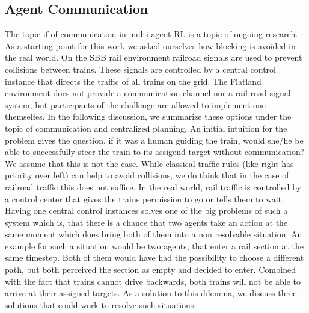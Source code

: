 \subsection*{Agent Communication}\label{agent_communication}
The topic if of communication in multi agent RL is a topic of ongoing research. As a starting point for this work we asked ourselves how blocking is avoided in the real world. On the SBB rail environment railroad signals are used to prevent collisions between trains. These signals are controlled by a central control instance that directs the traffic of all trains on the grid.
The Flatland environment does not provide a communication channel nor a rail road signal system, but participants of the challenge are allowed to implement one themselfes. In the following discussion, we summarize these options under the topic of communication and centralized planning. An initial intuition for the problem gives the question, if it was a human guiding the train, would she/he be able to successfully steer the train to its assigend target without communication?
We assume that this is not the case. While classical traffic rules (like right has priority over left) can help to avoid collisions, we do think that in the case of railroad traffic this does not suffice. In the real world, rail traffic is controlled by a control center that gives the trains permission to go or tells them to wait. Having one central control instances solves one of the big problems of such a system which is, that there is a chance that two agents take an action at the same moment which does bring both of them into a non resolvable situation. An example for such a situation would be two agents, that enter a rail section at the same timestep. Both of them would have had the possibility to choose a different path, but both perceived the section as empty and decided to enter. Combined with the fact that trains cannot drive backwards, both trains will not be able to arrive at their assigned targets. As a solution to this dilemma, we discuss three solutions that could work to resolve such situations.
